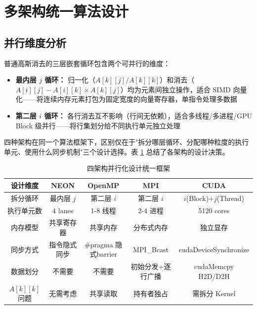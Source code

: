 \documentclass[a4paper]{article}
\begin{document}
\section{多架构统一算法设计}

\subsection{并行维度分析}

普通高斯消去的三层嵌套循环包含两个可并行的维度：

\begin{itemize}
    \item \textbf{最内层 $j$ 循环：} 归一化（$A[k][j] / A[k][k]$）和消去（$A[i][j] - A[i][k] \times A[k][j]$）均为元素间独立操作，适合 SIMD 向量化——将连续内存元素打包为固定宽度的向量寄存器，单指令处理多数据
    \item \textbf{第二层 $i$ 循环：} 各行消去互不影响（行间无依赖），适合多线程/多进程/GPU Block 级并行——将行集划分给不同执行单元独立处理
\end{itemize}

四种架构在同一个算法框架下，区别仅在于"拆分哪层循环、分配哪种粒度的执行单元、使用什么同步机制"三个设计选择。表 \ref{table:design} 总结了各架构的设计决策。

\begin{table}[H]
  \centering
  \caption{四架构并行化设计统一框架}
  \label{table:design}
  \small
  \begin{tabular}{|c|c|c|c|c|}
  \hline
  \textbf{设计维度} & \textbf{NEON} & \textbf{OpenMP} & \textbf{MPI} & \textbf{CUDA} \\
  \hline
  拆分循环 & 最内层 $j$ & 第二层 $i$ & 第二层 $i$ & $i$(Block)+$j$(Thread) \\
  执行单元数 & 4 lanes & 1-8 线程 & 2-4 进程 & 5120 cores \\
  内存模型 & 共享寄存器 & 共享内存 & 分布式内存 & 独立显存 \\
  同步方式 & 指令隐式同步 & \#pragma 隐式barrier & MPI\_Bcast & cudaDeviceSynchronize \\
  数据划分 & 不需要 & 不需要 & 初始分发+逐行广播 & cudaMemcpy H2D/D2H \\
  $A[k][k]$ 问题 & 无需考虑 & 共享读取 & 持有者独占 & 需拆分 Kernel \\
  \hline
  \end{tabular}
\end{table}
\end{document}
